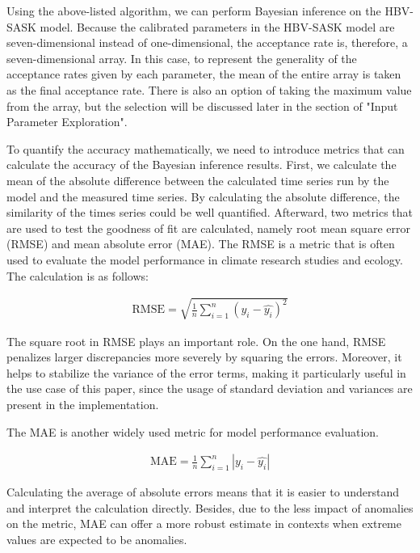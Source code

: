 Using the above-listed algorithm, we can perform Bayesian inference on the HBV-SASK model. Because the calibrated parameters in the HBV-SASK model are seven-dimensional instead of one-dimensional, the acceptance rate is, therefore, a seven-dimensional array. In this case, to represent the generality of the acceptance rates given by each parameter, the mean of the entire array is taken as the final acceptance rate. There is also an option of taking the maximum value from the array, but the selection will be discussed later in the section of "Input Parameter Exploration".

To quantify the accuracy mathematically, we need to introduce metrics that can calculate the accuracy of the Bayesian inference results. First, we calculate the mean of the absolute difference between the calculated time series run by the model and the measured time series. By calculating the absolute difference, the similarity of the times series could be well quantified. Afterward, two metrics that are used to test the goodness of fit are calculated, namely root mean square error (RMSE) and mean absolute error (MAE). The RMSE is a metric that is often used to evaluate the model performance in climate research studies and ecology. The calculation is as follows: 

\begin{align}
\text{RMSE} = \sqrt{\frac 1 n \sum_{i=1}^n (y_i - \hat{y_i})^2}
\end{align}

The square root in RMSE plays an important role. On the one hand, RMSE penalizes larger discrepancies more severely by squaring the errors.\cite{RMSE_discrepency_penalty} Moreover, it helps to stabilize the variance of the error terms, making it particularly useful in the use case of this paper, since the usage of standard deviation and variances are present in the implementation.\cite{RMSE_MAE}

The MAE is another widely used metric for model performance evaluation.\cite{RMSE_MAE} 

\begin{align}
\text{MAE} = \frac 1 n \sum_{i=1}^n |y_i - \hat{y_i}|
\end{align}

Calculating the average of absolute errors means that it is easier to understand and interpret the calculation directly. Besides, due to the less impact of anomalies on the metric,\cite{RMSE_MAE} MAE can offer a more robust estimate in contexts when extreme values are expected to be anomalies.

